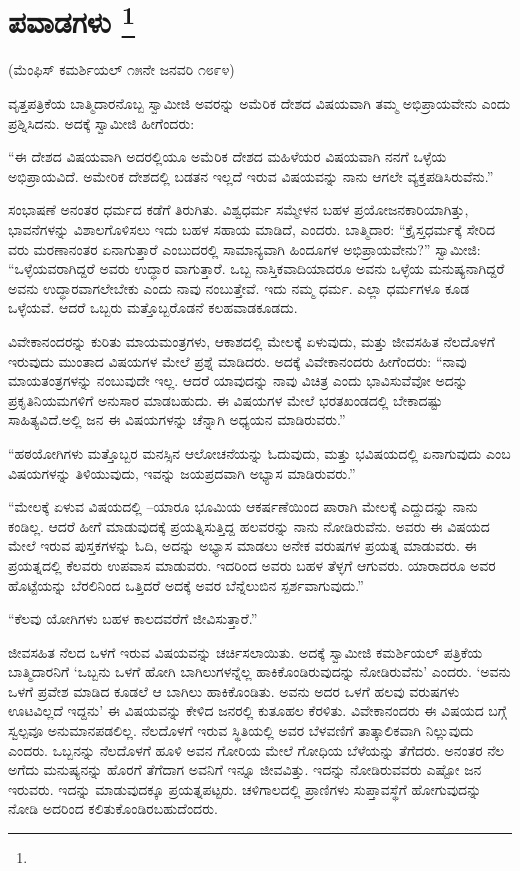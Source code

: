 
\chapter[ಪವಾಡಗಳು ]{ಪವಾಡಗಳು \protect\footnote{}}

\centerline{(ಮೆಂಫಿಸ್​ ಕಮರ್ಶಿಯಲ್​ ೧೫ನೇ ಜನವರಿ ೧೮೯೪)}

ವೃತ್ತಪತ್ರಿಕೆಯ ಬಾತ್ಮಿದಾರನೊಬ್ಬ ಸ್ವಾಮೀಜಿ ಅವರನ್ನು ಅಮೆರಿಕ ದೇಶದ ವಿಷಯವಾಗಿ ತಮ್ಮ ಅಭಿಪ್ರಾಯವೇನು ಎಂದು ಪ್ರಶ್ನಿಸಿದನು. ಅದಕ್ಕೆ ಸ್ವಾಮೀಜಿ ಹೀಗೆಂದರು:

“ಈ ದೇಶದ ವಿಷಯವಾಗಿ ಅದರಲ್ಲಿಯೂ ಅಮೆರಿಕ ದೇಶದ ಮಹಿಳೆಯರ ವಿಷಯವಾಗಿ ನನಗೆ ಒಳ್ಳೆಯ ಅಭಿಪ್ರಾಯವಿದೆ. ಅಮೇರಿಕ ದೇಶದಲ್ಲಿ ಬಡತನ ಇಲ್ಲದೆ ಇರುವ ವಿಷಯವನ್ನು ನಾನು ಆಗಲೇ ವ್ಯಕ್ತಪಡಿಸಿರುವೆನು.”

ಸಂಭಾಷಣೆ ಅನಂತರ ಧರ್ಮದ ಕಡೆಗೆ ತಿರುಗಿತು. ವಿಶ್ವಧರ್ಮ ಸಮ್ಮೇಳನ ಬಹಳ ಪ್ರಯೋಜನಕಾರಿಯಾಗಿತ್ತು, ಭಾವನೆಗಳನ್ನು ವಿಶಾಲಗೊಳಿಸಲು ಇದು ಬಹಳ ಸಹಾಯ ಮಾಡಿದೆ, ಎಂದರು. ಬಾತ್ಮಿದಾರ: “ಕ್ರೈಸ್ತಧರ್ಮಕ್ಕೆ ಸೇರಿದ ವರು ಮರಣಾನಂತರ ಏನಾಗುತ್ತಾರೆ ಎಂಬುದರಲ್ಲಿ ಸಾಮಾನ್ಯವಾಗಿ ಹಿಂದೂಗಳ ಅಭಿಪ್ರಾಯವೇನು?” ಸ್ವಾಮೀಜಿ: “ಒಳ್ಳೆಯವರಾಗಿದ್ದರೆ ಅವರು ಉದ್ಧಾರ ವಾಗುತ್ತಾರೆ. ಒಬ್ಬ ನಾಸ್ತಿಕವಾದಿಯಾದರೂ ಅವನು ಒಳ್ಳೆಯ ಮನುಷ್ಯನಾಗಿದ್ದರೆ ಅವನು ಉದ್ಧಾರವಾಗಲೇಬೇಕು ಎಂದು ನಾವು ನಂಬುತ್ತೇವೆ. ಇದು ನಮ್ಮ ಧರ್ಮ. ಎಲ್ಲಾ ಧರ್ಮಗಳೂ ಕೂಡ ಒಳ್ಳೆಯವೆ. ಆದರೆ ಒಬ್ಬರು ಮತ್ತೊಬ್ಬರೊಡನೆ ಕಲಹವಾಡಕೂಡದು.

ವಿವೇಕಾನಂದರನ್ನು ಕುರಿತು ಮಾಯಮಂತ್ರಗಳು, ಆಕಾಶದಲ್ಲಿ ಮೇಲಕ್ಕೆ ಏಳುವುದು, ಮತ್ತು ಜೀವಸಹಿತ ನೆಲದೊಳಗೆ ಇರುವುದು ಮುಂತಾದ ವಿಷಯಗಳ ಮೇಲೆ ಪ್ರಶ್ನೆ ಮಾಡಿದರು. ಅದಕ್ಕೆ ವಿವೇಕಾನಂದರು ಹೀಗೆಂದರು: “ನಾವು ಮಾಯತಂತ್ರಗಳನ್ನು ನಂಬುವುದೇ ಇಲ್ಲ. ಆದರೆ ಯಾವುದನ್ನು ನಾವು ವಿಚಿತ್ರ ಎಂದು ಭಾವಿಸುವೆವೋ ಅದನ್ನು ಪ್ರಕೃತಿನಿಯಮಗಳಿಗೆ ಅನುಸಾರ ಮಾಡಬಹುದು. ಈ ವಿಷಯಗಳ ಮೇಲೆ ಭರತಖಂಡದಲ್ಲಿ ಬೇಕಾದಷ್ಟು ಸಾಹಿತ್ಯವಿದೆ.ಅಲ್ಲಿ ಜನ ಈ ವಿಷಯಗಳನ್ನು ಚೆನ್ನಾಗಿ ಅಧ್ಯಯನ ಮಾಡಿರುವರು.”

“ಹಠಯೋಗಿಗಳು ಮತ್ತೊಬ್ಬರ ಮನಸ್ಸಿನ ಆಲೋಚನೆಯನ್ನು ಓದುವುದು, ಮತ್ತು ಭವಿಷಯದಲ್ಲಿ ಏನಾಗುವುದು ಎಂಬ ವಿಷಯಗಳನ್ನು ತಿಳಿಯುವುದು, ಇವನ್ನು ಜಯಪ್ರದವಾಗಿ ಅಭ್ಯಾಸ ಮಾಡಿರುವರು.”

“ಮೇಲಕ್ಕೆ ಏಳುವ ವಿಷಯದಲ್ಲಿ –ಯಾರೂ ಭೂಮಿಯ ಆಕರ್ಷಣೆಯಿಂದ ಪಾರಾಗಿ ಮೇಲಕ್ಕೆ ಎದ್ದುದನ್ನು ನಾನು ಕಂಡಿಲ್ಲ. ಆದರೆ ಹೀಗೆ ಮಾಡುವುದಕ್ಕೆ ಪ್ರಯತ್ನಿಸುತ್ತಿದ್ದ ಹಲವರನ್ನು ನಾನು ನೋಡಿರುವೆನು. ಅವರು ಈ ವಿಷಯದ ಮೇಲೆ ಇರುವ ಪುಸ್ತಕಗಳನ್ನು ಓದಿ, ಅದನ್ನು ಅಭ್ಯಾಸ ಮಾಡಲು ಅನೇಕ ವರುಷಗಳ ಪ್ರಯತ್ನ ಮಾಡುವರು. ಈ ಪ್ರಯತ್ನದಲ್ಲಿ ಕೆಲವರು ಉಪವಾಸ ಮಾಡುವರು. ಇದರಿಂದ ಅವರು ಬಹಳ ತೆಳ್ಳಗೆ ಆಗುವರು. ಯಾರಾದರೂ ಅವರ ಹೊಟ್ಟೆಯನ್ನು ಬೆರಲಿನಿಂದ ಒತ್ತಿದರೆ ಅದಕ್ಕೆ ಅವರ ಬೆನ್ನೆಲುಬಿನ ಸ್ಪರ್ಶವಾಗುವುದು.”

“ಕೆಲವು ಯೋಗಿಗಳು ಬಹಳ ಕಾಲದವರೆಗೆ ಜೀವಿಸುತ್ತಾರೆ.”

ಜೀವಸಹಿತ ನೆಲದ ಒಳಗೆ ಇರುವ ವಿಷಯವನ್ನು ಚರ್ಚಿಸಲಾಯಿತು. ಅದಕ್ಕೆ ಸ್ವಾಮೀಜಿ ಕಮರ್ಶಿಯಲ್​ ಪತ್ರಿಕೆಯ ಬಾತ್ಮಿದಾರನಿಗೆ ‘ಒಬ್ಬನು ಒಳಗೆ ಹೋಗಿ ಬಾಗಿಲುಗಳನ್ನೆಲ್ಲ ಹಾಕಿಕೊಂಡಿರುವುದನ್ನು ನೋಡಿರುವೆನು’ ಎಂದರು. ‘ಅವನು ಒಳಗೆ ಪ್ರವೇಶ ಮಾಡಿದ ಕೂಡಲೆ ಆ ಬಾಗಿಲು ಹಾಕಿಕೊಂಡಿತು. ಅವನು ಅದರ ಒಳಗೆ ಹಲವು ವರುಷಗಳು ಊಟವಿಲ್ಲದೆ ಇದ್ದನು’ ಈ ವಿಷಯವನ್ನು ಕೇಳಿದ ಜನರಲ್ಲಿ ಕುತೂಹಲ ಕೆರಳಿತು. ವಿವೇಕಾನಂದರು ಈ ವಿಷಯದ ಬಗ್ಗೆ ಸ್ವಲ್ಪವೂ ಅನುಮಾನಪಡಲಿಲ್ಲ. ನೆಲದೊಳಗೆ ಇರುವ ಸ್ಥಿತಿಯಲ್ಲಿ ಅವರ ಬೆಳವಣಿಗೆ ತಾತ್ಕಾಲಿಕವಾಗಿ ನಿಲ್ಲುವುದು ಎಂದರು. ಒಬ್ಬನನ್ನು ನೆಲದೊಳಗೆ ಹೂಳಿ ಅವನ ಗೋರಿಯ ಮೇಲೆ ಗೋಧಿಯ ಬೆಳೆಯನ್ನು ತೆಗೆದರು. ಅನಂತರ ನೆಲ ಅಗೆದು ಮನುಷ್ಯನನ್ನು ಹೊರಗೆ ತೆಗೆದಾಗ ಅವನಿಗೆ ಇನ್ನೂ ಜೀವವಿತ್ತು. ಇದನ್ನು ನೋಡಿರುವವರು ಎಷ್ಟೋ ಜನ ಇರುವರು. ಇದನ್ನು ಮಾಡುವುದಕ್ಕೂ ಪ್ರಯತ್ನಪಟ್ಟರು. ಚಳಿಗಾಲದಲ್ಲಿ ಪ್ರಾಣಿಗಳು ಸುಪ್ತಾವಸ್ಥೆಗೆ ಹೋಗುವುದನ್ನು ನೋಡಿ ಅದರಿಂದ ಕಲಿತುಕೊಂಡಿರಬಹುದೆಂದರು.


